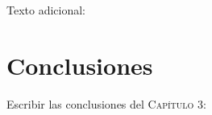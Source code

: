 Texto adicional: \lipsum[5]


\section{Conclusiones}
Escribir las conclusiones del \textsc{Capítulo 3}: \lipsum[2]


\begin{refcontext}[sorting=nyt]
\printbibliography[title={Referencias}, heading=subbibintoc]
\end{refcontext}
